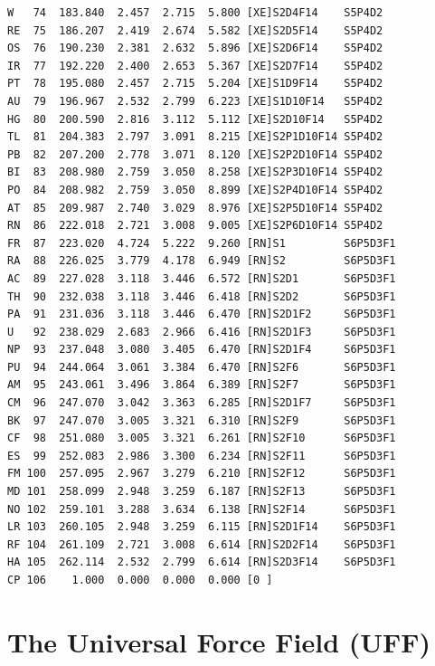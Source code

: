 \documentclass[final,12pt]{article}
\begin{document}
{{{{{{\begin{verbatim}
W   74  183.840  2.457  2.715  5.800 [XE]S2D4F14    S5P4D2    
RE  75  186.207  2.419  2.674  5.582 [XE]S2D5F14    S5P4D2    
OS  76  190.230  2.381  2.632  5.896 [XE]S2D6F14    S5P4D2    
IR  77  192.220  2.400  2.653  5.367 [XE]S2D7F14    S5P4D2    
PT  78  195.080  2.457  2.715  5.204 [XE]S1D9F14    S5P4D2    
AU  79  196.967  2.532  2.799  6.223 [XE]S1D10F14   S5P4D2    
HG  80  200.590  2.816  3.112  5.112 [XE]S2D10F14   S5P4D2    
TL  81  204.383  2.797  3.091  8.215 [XE]S2P1D10F14 S5P4D2    
PB  82  207.200  2.778  3.071  8.120 [XE]S2P2D10F14 S5P4D2    
BI  83  208.980  2.759  3.050  8.258 [XE]S2P3D10F14 S5P4D2    
PO  84  208.982  2.759  3.050  8.899 [XE]S2P4D10F14 S5P4D2    
AT  85  209.987  2.740  3.029  8.976 [XE]S2P5D10F14 S5P4D2    
RN  86  222.018  2.721  3.008  9.005 [XE]S2P6D10F14 S5P4D2    
FR  87  223.020  4.724  5.222  9.260 [RN]S1         S6P5D3F1  
RA  88  226.025  3.779  4.178  6.949 [RN]S2         S6P5D3F1  
AC  89  227.028  3.118  3.446  6.572 [RN]S2D1       S6P5D3F1  
TH  90  232.038  3.118  3.446  6.418 [RN]S2D2       S6P5D3F1  
PA  91  231.036  3.118  3.446  6.470 [RN]S2D1F2     S6P5D3F1  
U   92  238.029  2.683  2.966  6.416 [RN]S2D1F3     S6P5D3F1  
NP  93  237.048  3.080  3.405  6.470 [RN]S2D1F4     S6P5D3F1  
PU  94  244.064  3.061  3.384  6.470 [RN]S2F6       S6P5D3F1  
AM  95  243.061  3.496  3.864  6.389 [RN]S2F7       S6P5D3F1  
CM  96  247.070  3.042  3.363  6.285 [RN]S2D1F7     S6P5D3F1  
BK  97  247.070  3.005  3.321  6.310 [RN]S2F9       S6P5D3F1  
CF  98  251.080  3.005  3.321  6.261 [RN]S2F10      S6P5D3F1  
ES  99  252.083  2.986  3.300  6.234 [RN]S2F11      S6P5D3F1  
FM 100  257.095  2.967  3.279  6.210 [RN]S2F12      S6P5D3F1  
MD 101  258.099  2.948  3.259  6.187 [RN]S2F13      S6P5D3F1  
NO 102  259.101  3.288  3.634  6.138 [RN]S2F14      S6P5D3F1  
LR 103  260.105  2.948  3.259  6.115 [RN]S2D1F14    S6P5D3F1  
RF 104  261.109  2.721  3.008  6.614 [RN]S2D2F14    S6P5D3F1  
HA 105  262.114  2.532  2.799  6.614 [RN]S2D3F14    S6P5D3F1  
CP 106    1.000  0.000  0.000  0.000 [0 ]                     
\end{verbatim}
\normalsize

\newpage
\section{The Universal Force Field (UFF)\label{sec:UFF}}

}}}}}}
\end{document}
